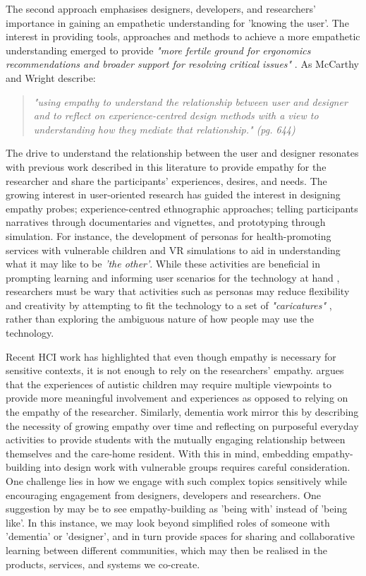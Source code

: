 The second approach emphasises designers, developers, and researchers' importance in gaining an empathetic understanding for 'knowing the user'. The interest in providing tools, approaches and methods to achieve a more empathetic understanding emerged to provide \textit{"more fertile ground for ergonomics recommendations and broader support for resolving critical issues"} \citep{suri2001next}. As McCarthy and Wright describe: 
\begin{quote}
\textit{"using empathy to understand the relationship between user and designer and to reflect on experience-centred design methods with a view to understanding how they mediate that relationship." \citep{wright2008empathy}(pg. 644)}    
\end{quote}

The drive to understand the relationship between the user and designer resonates with previous work described in this literature to provide empathy for the researcher and share the participants' experiences, desires, and needs. The growing interest in user-oriented research has guided the interest in designing empathy probes; experience-centred ethnographic approaches; telling participants narratives through documentaries and vignettes, and prototyping through simulation. For instance, the development of personas  for health-promoting services with vulnerable children \citep{warnestaal2014co} and VR simulations to aid in understanding what it may like to be \textit{'the other'}. While these activities are beneficial in prompting learning and informing user scenarios for the technology at hand \citep{vines_age-old_2015}, researchers must be wary that activities such as personas may reduce flexibility and creativity by attempting to fit the technology to a set of \textit{"caricatures"} \citep{redstrom_towards_2006}, rather than exploring the ambiguous nature of how people may use the technology. 

Recent HCI work has highlighted that even though empathy is necessary for sensitive contexts, it is not enough to rely on the researchers' empathy. \cite{spiel2017empathy} argues that the experiences of autistic children may require multiple viewpoints to provide more meaningful involvement and experiences as opposed to relying on the empathy of the researcher. Similarly, \cite{foley_student_2020} dementia work mirror this by describing the necessity of growing empathy over time and reflecting on purposeful everyday activities to provide students with the mutually engaging relationship between themselves and the care-home resident. With this in mind, embedding empathy-building into design work with vulnerable groups requires careful consideration. One challenge lies in how we engage with such complex topics sensitively while encouraging engagement from designers, developers and researchers. One suggestion by \cite{bennett_promise_2019} may be to see empathy-building as 'being with' instead of 'being like'. In this instance, we may look beyond simplified roles of someone with 'dementia' or 'designer', and in turn provide spaces for sharing and collaborative learning between different communities, which may then be realised in the products, services, and systems we co-create.

